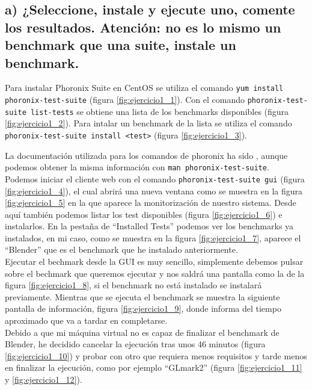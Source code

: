 \subsection{a) ¿Seleccione, instale y ejecute uno, comente los resultados. Atención: no es lo mismo un benchmark que una suite, instale un benchmark.}

Para instalar Phoronix Suite en CentOS \cite{phoronix} se utiliza el comando  \texttt{yum install \\ phoronix-test-suite} (figura \ref{fig:ejercicio1_1}). Con el comando \texttt{phoronix-test-suite list-tests} se obtiene una lista de los benchmarks disponibles (figura \ref{fig:ejercicio1_2}). Para intalar un benchmark de la lista se utiliza el comando \texttt{phoronix-test-suite install <test>} (figura \ref{fig:ejercicio1_3}).

La documentación utilizada para los comandos de phoronix ha sido \cite{phoroniComandos}, aunque podemos obtener la misma información con \texttt{man phoronix-test-suite}.\\

Podemos iniciar el cliente web con el comando \texttt{phoronix-test-suite gui} (figura \ref{fig:ejercicio1_4}), el cual abrirá una nueva ventana como se muestra en la figura \ref{fig:ejercicio1_5} en la que aparece la monitorización de nuestro sistema. Desde aquí también podemos listar los test disponibles (figura \ref{fig:ejercicio1_6}) e instalarlos. En la pestaña de ``Installed Tests'' podemos ver los benchmarks ya instalados, en mi caso, como se muestra en la figura \ref{fig:ejercicio1_7}, aparece el ``Blender'' que es el benchmark que he instalado anteriormente.\\

Ejecutar el bechmark desde la GUI es muy sencillo, simplemente debemos pulsar sobre el bechmark que queremos ejecutar y nos saldrá una pantalla como la de la figura \ref{fig:ejercicio1_8}, si el benchmark no está instalado se instalará previamente. Mientras que se ejecuta el benchmark se muestra la siguiente pantalla de información, figura \ref{fig:ejercicio1_9}, donde informa del tiempo aproximado que va a tardar en completarse.\\

Debido a que mi máquina virtual no es capaz de finalizar el benchmark de Blender, he decidido cancelar la ejecución tras unos 46 minutos (figura \ref{fig:ejercicio1_10}) y probar con otro que requiera menos requisitos y tarde menos en finalizar la ejecución, como por ejemplo ``GLmark2'' (figura \ref{fig:ejercicio1_11} y \ref{fig:ejercicio1_12}).\\

